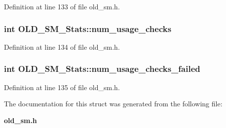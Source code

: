 Definition at line 133 of file old\_\-sm.h.
\subsubsection{\setlength{\rightskip}{0pt plus 5cm}int \bf{OLD\_\-SM\_\-Stats::num\_\-usage\_\-checks}}\label{structOLD__SM__Stats_0a750a1bb30af44a2a1ddb4b788b5c66}




Definition at line 134 of file old\_\-sm.h.
\subsubsection{\setlength{\rightskip}{0pt plus 5cm}int \bf{OLD\_\-SM\_\-Stats::num\_\-usage\_\-checks\_\-failed}}\label{structOLD__SM__Stats_b1a9040433c434b802301e4917852db4}




Definition at line 135 of file old\_\-sm.h.

The documentation for this struct was generated from the following file:\begin{CompactItemize}
\item 
\bf{old\_\-sm.h}\end{CompactItemize}
